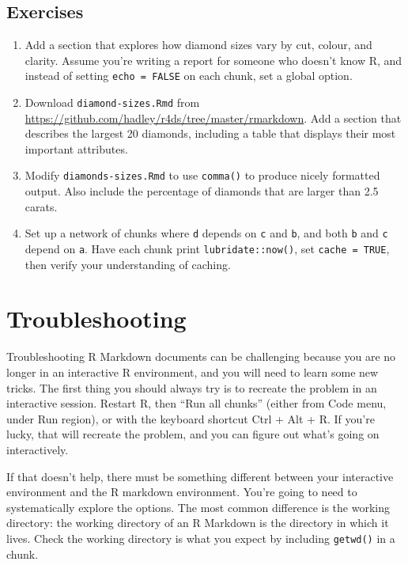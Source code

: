 \documentclass[]{book}
\begin{document}
\subsection{Exercises}\label{exercises-70}

\begin{enumerate}
\def\labelenumi{\arabic{enumi}.}
\item
  Add a section that explores how diamond sizes vary by cut, colour, and
  clarity. Assume you're writing a report for someone who doesn't know
  R, and instead of setting \texttt{echo\ =\ FALSE} on each chunk, set a
  global option.
\item
  Download \texttt{diamond-sizes.Rmd} from
  \url{https://github.com/hadley/r4ds/tree/master/rmarkdown}. Add a
  section that describes the largest 20 diamonds, including a table that
  displays their most important attributes.
\item
  Modify \texttt{diamonds-sizes.Rmd} to use \texttt{comma()} to produce
  nicely formatted output. Also include the percentage of diamonds that
  are larger than 2.5 carats.
\item
  Set up a network of chunks where \texttt{d} depends on \texttt{c} and
  \texttt{b}, and both \texttt{b} and \texttt{c} depend on \texttt{a}.
  Have each chunk print \texttt{lubridate::now()}, set
  \texttt{cache\ =\ TRUE}, then verify your understanding of caching.
\end{enumerate}

\section{Troubleshooting}\label{troubleshooting}

Troubleshooting R Markdown documents can be challenging because you are
no longer in an interactive R environment, and you will need to learn
some new tricks. The first thing you should always try is to recreate
the problem in an interactive session. Restart R, then ``Run all
chunks'' (either from Code menu, under Run region), or with the keyboard
shortcut Ctrl + Alt + R. If you're lucky, that will recreate the
problem, and you can figure out what's going on interactively.

If that doesn't help, there must be something different between your
interactive environment and the R markdown environment. You're going to
need to systematically explore the options. The most common difference
is the working directory: the working directory of an R Markdown is the
directory in which it lives. Check the working directory is what you
expect by including \texttt{getwd()} in a chunk.
\end{document}
